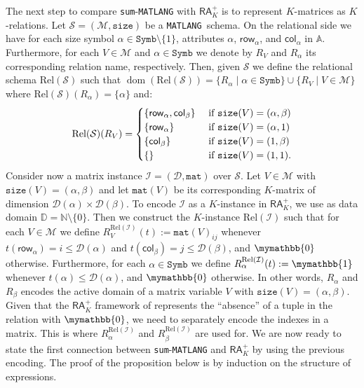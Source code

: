 \documentclass[sigconf]{acmart}
\newcommand{\Mnam}{\mathcal{M}}
\newcommand{\I}{\mathcal{I}}
\newcommand{\Sch}{\mathcal{S}}
\newcommand{\dom}{\mathcal{D}}
\newcommand{\conc}{\texttt{mat}}
\newcommand{\DD}{\texttt{Symb}}
\newcommand{\size}{\texttt{size}}
\newcommand{\lang}{\texttt{MATLANG}\xspace}
\newcommand{\langsum}{\texttt{sum}-\texttt{MATLANG}\xspace}
\newcommand{\ddom}{\mathbb{D}}
\newcommand{\fdom}{\operatorname{dom}}
\newcommand{\att}{\mathbb{A}}
\newcommand{\kzero}{\mymathbb{0}}
\newcommand{\kone}{\mymathbb{1}}
\newcommand{\row}{\mathsf{row}}
\newcommand{\col}{\mathsf{col}}
\begin{document}
The next step to compare \langsum with $\mathsf{RA}_{K}^+$  is to represent $K$-matrices as $K$-relations.
Let $\Sch=(\Mnam,\size)$ be a \lang\ schema. On the relational side
we have for each size symbol $\alpha\in\DD\setminus\{1\}$, attributes $\alpha$, $\row_\alpha$, and $\col_\alpha$ in $\att$. Furthermore, for each $V\in\Mnam$ and $\alpha \in \DD$ we denote
by $R_V$ and $R_\alpha$ its corresponding relation name, respectively. Then, given $\Sch$ we define the relational schema $\text{Rel}(\Sch)$ such that $\fdom(\text{Rel}(\Sch)) =  \{R_\alpha \mid \alpha\in\DD\} \cup \{R_V \mid V \in \Mnam\}$ where $\text{Rel}(\Sch)(R_\alpha) = \{\alpha\}$ and:
\[
\text{Rel}(\Sch)(R_V) = \begin{cases}
\lbrace\row_\alpha,\col_\beta \rbrace & \text{ if $ \size(V)=(\alpha,\beta)$} \\
\lbrace\row_\alpha \rbrace & \text{ if $ \size(V)=(\alpha,1)$} \\
\lbrace\col_\beta \rbrace  &
\text{ if $ \size(V)=(1,\beta)$} \\
\lbrace\rbrace & \text{ if $\size(V)=(1,1)$}.
\end{cases}
\]
Consider now a matrix instance $\I = (\dom,\conc)$ over $\Sch$.
Let $V\in\Mnam$ with $\size(V)=(\alpha,\beta)$ and let $\conc(V)$ be its corresponding $K$-matrix of dimension $\dom(\alpha)\times \dom(\beta)$.
To encode $\I$ as a $K$-instance in $\mathsf{RA}_{K}^+$, we use as data domain $\ddom = \mathbb{N} \setminus \{0\}$. Then we construct the $K$-instance $\text{Rel}(\I)$ such that for each $V\in\Mnam$ we define 
$R_V^{\text{Rel}(\I)}(t):=\conc(V)_{ij}$ whenever $t(\row_\alpha) = i \leq \dom(\alpha)$ and $t(\col_\beta) = j \leq \dom(\beta)$, and $\kzero$ otherwise. Furthermore, for each $\alpha \in \DD$ we define $R_\alpha^{\text{Rel}(\I)}(t):=\kone$ whenever $t(\alpha) \leq \dom(\alpha)$, and $\kzero$ otherwise. In other words, $R_\alpha$ and $R_\beta$ encodes the active domain of a matrix variable $V$ with $\size(V)=(\alpha,\beta)$. Given that the $\mathsf{RA}_{K}^+$ framework of \cite{GreenKT07} represents the ``absence'' of a tuple in the relation with $\kzero$, we need to separately encode the indexes in a matrix.
This is where $R_\alpha^{\text{Rel}(\I)}$ and $R_\beta^{\text{Rel}(\I)}$ are used for.
We are now ready to state the first connection between \langsum and $\mathsf{RA}_{K}^+$  by using the previous encoding. The proof of the proposition below is by induction on the structure of expressions.
\end{document}
